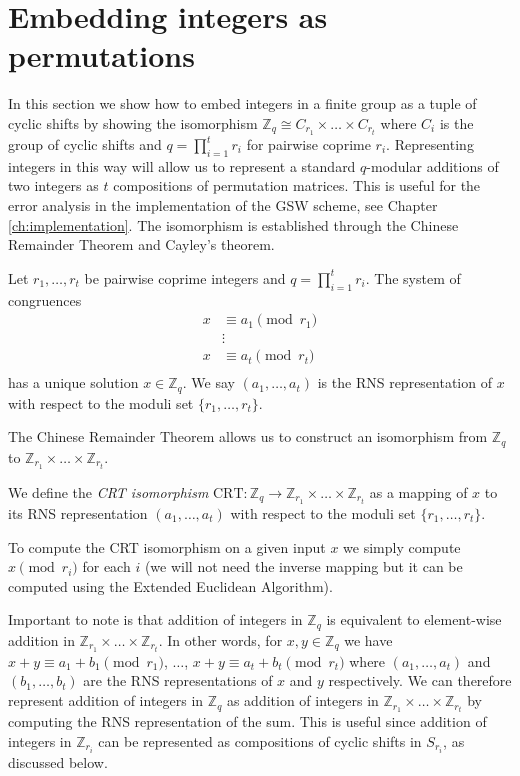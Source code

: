 \section{Embedding integers as permutations}\label{sec:embedding}
In this section we show how to embed integers in a finite group as a tuple of cyclic shifts by showing the isomorphism $\mathbb{Z}_q \cong C_{r_1} \times \dots \times C_{r_t}$ where $C_i$ is the group of cyclic shifts and $q = \prod_{i=1}^t r_i$ for pairwise coprime $r_i$. Representing integers in this way will allow us to represent a standard $q$-modular additions of two integers as $t$ compositions of permutation matrices. This is useful for the error analysis in the implementation of the GSW scheme, see Chapter \ref{ch:implementation}. The isomorphism is established through the Chinese Remainder Theorem and Cayley's theorem.
\begin{theorem}
    Let $r_1, \dots, r_t$ be pairwise coprime integers and $q = \prod_{i=1}^t r_i$.
    The system of congruences
    \begin{equation*}
    \begin{array}{rl}
        x & \equiv a_1 \pmod{r_1} \\
        &  \vdots \\
        x & \equiv a_t \pmod{r_t} \\
    \end{array}
    \end{equation*}
    has a unique solution $x \in \mathbb{Z}_q$.
    We say $(a_1, \dots, a_t)$ is the RNS representation of $x$ with respect to the moduli set $\{r_1, \dots, r_t\}$.
\end{theorem}
The Chinese Remainder Theorem allows us to construct an isomorphism from $\mathbb{Z}_q$ to $\mathbb{Z}_{r_1} \times \dots \times \mathbb{Z}_{r_t}$.
\begin{definition}
    We define the \textit{CRT isomorphism} $\textrm{CRT} \colon \mathbb{Z}_q \rightarrow \mathbb{Z}_{r_1} \times \dots \times \mathbb{Z}_{r_t}$ as a mapping of $x$ to its RNS representation $(a_1, \dots, a_t)$ with respect to the moduli set $\{r_1, \dots, r_t\}$.
\end{definition}
\begin{remark}
    To compute the CRT isomorphism on a given input $x$ we simply compute $x \pmod {r_i}$ for each $i$ (we will not need the inverse mapping but it can be computed using the Extended Euclidean Algorithm).
\end{remark}
Important to note is that addition of integers in $\mathbb{Z}_q$ is equivalent to element-wise addition in $\mathbb{Z}_{r_1} \times \dots \times \mathbb{Z}_{r_t}$. In other words, for $x, y \in \mathbb{Z}_q$ we have $x + y \equiv a_1 + b_1 \pmod{r_1}$, $\dots$, $x + y \equiv a_t + b_t \pmod{r_t}$ where $(a_1, \dots, a_t)$ and $(b_1, \dots, b_t)$ are the RNS representations of $x$ and $y$ respectively. We can therefore represent addition of integers in $\mathbb{Z}_q$ as addition of integers in $\mathbb{Z}_{r_1} \times \dots \times \mathbb{Z}_{r_t}$ by computing the RNS representation of the sum. This is useful since addition of integers in $\mathbb{Z}_{r_i}$ can be represented as compositions of cyclic shifts in $S_{r_i}$, as discussed below.
